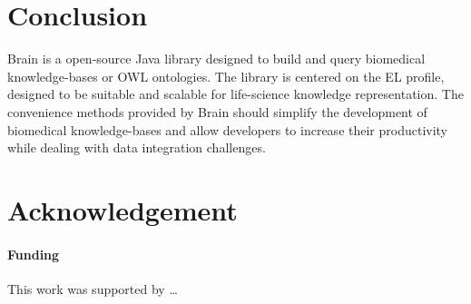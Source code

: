 \documentclass{bioinfo}
\begin{document}
\section{Conclusion}
Brain is a open-source Java library designed to build and query biomedical knowledge-bases or OWL ontologies.
The library is centered on the EL profile, designed to be suitable and scalable for life-science knowledge representation. 
The convenience methods provided by Brain should simplify the development of biomedical knowledge-bases and allow developers
to increase their productivity while dealing with data integration challenges.

\section*{Acknowledgement}
\paragraph{Funding\textcolon}
This work was supported by …
 
%  
%  
%  
%  
%  
% 
%  
% 
%  
 
\end{document}
